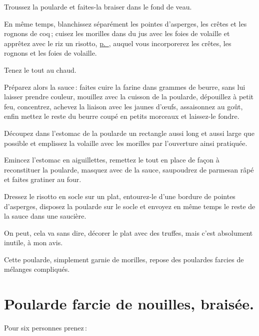 Troussez la poularde et faites-la braiser dans le fond de veau.

En même temps, blanchissez séparément les pointes d'asperges, les crêtes et les
rognons de coq ; cuisez les morilles dans du jus avec les foies de volaille et
apprêtez avec le riz un risotto, \hyperlink{p0712-2}{p. \pageref{pg0712-2}}, auquel
vous incorporerez les crêtes, les rognons et les foies de volaille.

Tenez le tout au chaud.

Préparez alors la sauce : faites cuire la farine dans {\mmm} grammes de beurre, sans
lui laisser prendre couleur, mouillez avec la cuisson de la poularde, dépouillez à
petit feu, concentrez, achevez la liaison avec les jaunes d'œufs, assaisonnez au
goût, enfin mettez le reste du beurre coupé en petits morceaux et laissez-le fondre.

Découpez dans l'estomac de la poularde un rectangle aussi long et aussi large
que possible et emplissez la volaille avec les morilles par l'ouverture ainsi
pratiquée.

Emincez l'estomac en aiguillettes, remettez le tout en place de façon
à reconstituer la poularde, masquez avec de la sauce, saupoudrez de parmesan
râpé et faites gratiner au four.

Dressez le risotto en socle sur un plat, entourez-le d'une bordure de pointes
d’asperges, disposez la poularde sur le socle et envoyez en même temps le reste
de la sauce dans une saucière.

On peut, cela va sans dire, décorer le plat avec des truffes, mais c'est
absolument inutile, à mon avis.

Cette poularde, simplement garnie de morilles, repose des poulardes farcies de
mélanges compliqués.

\section*{\centering Poularde farcie de nouilles, braisée.}
{}

Pour six personnes prenez :

\medskip

